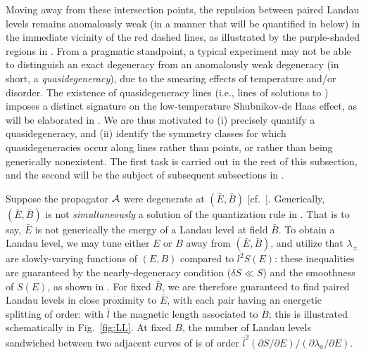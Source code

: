 \documentclass[aps, showpacs, twocolumn, notitlepage, superscriptaddress]{revtex4-1}
\begin{document}
Moving away from these intersection points, the repulsion between paired Landau levels  remains anomalously weak (in a manner that will be quantified in  below) in the immediate vicinity of the red dashed lines, as illustrated by the purple-shaded regions in .  From a pragmatic standpoint, a typical experiment may not be able to distinguish an exact degeneracy from an anomalously weak degeneracy (in short, a \textit{quasidegeneracy}), due to the smearing effects of temperature and/or disorder\cite{shoenberg_magnetic_2009}. The existence of  quasidegeneracy lines (i.e., lines of solutions to ) imposes a distinct signature on the low-temperature Shubnikov-de Haas effect, as will be elaborated in .  We are thus motivated to (i) precisely quantify a quasidegeneracy, and (ii) identify the symmetry classes for which quasidegeneracies occur along lines rather than points, or rather than being generically nonexistent. The first task is carried out in the rest of this subsection, and the second will be the subject of subsequent subsections in . 

Suppose the propagator ${\cal A}$ were degenerate at $(\bar{E},\bar{B})$ [cf.\ ]. Generically, $(\bar{E},\bar{B})$ is not \emph{simultaneously} a solution of the quantization rule in .  
That is to say, $\bar{E}$ is not generically the energy of a Landau level at field $\bar{B}$. To obtain a Landau level, we may tune either $E$ or $B$   away from $(\bar{E},\bar{B})$, and  utilize that  $\lambda_{\pm}$ are slowly-varying functions of $(E,B)$ compared to $l^2S(E)$:
these inequalities are guaranteed by the nearly-degeneracy condition ($\delta S{\ll}S$) and the smoothness of $S(E)$, as shown in .  For fixed $\bar{B}$, we are therefore guaranteed to find paired Landau levels  in close proximity to $\bar{E}$, with each pair having an energetic splitting of order:
with $\bar{l}$ the magnetic length associated to $\bar{B}$; this is illustrated schematically in Fig.\ \ref{fig:LL}. At fixed $B$, the number of Landau levels sandwiched between two adjacent curves of  is of order $\bar{l}^2(\partial S/\partial E)/(\partial \lambda_a/\partial E).$
\end{document}
